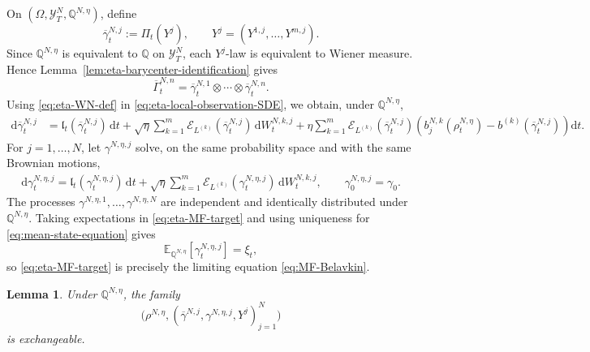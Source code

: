 \documentclass[10pt,a4paper,reqno]{amsart}
\numberwithin{equation}{section}
\theoremstyle{plain}
\newtheorem{lemma}[theorem]{Lemma}
\theoremstyle{definition}
\theoremstyle{remark}
\renewcommand{\d}{\mathrm d}
\newcommand{\E}{\mathbb E}
\newcommand{\Q}{\mathbb Q}
\newcommand{\cE}{\mathcal E}
\newcommand{\cY}{\mathcal Y}
\newcommand{\1}{\mathbf 1}
\begin{document}
On \((\Omega,\cY_T^N,\Q^{N,\eta})\), define
\begin{equation}
  \overline\gamma_t^{N,j}
  :=
  \Pi_t(Y^j),
  \qquad
  Y^j=(Y^{1,j},\ldots,Y^{m,j}).
  \label{eq:eta-bar-gamma-N-def}
\end{equation}
Since \(\Q^{N,\eta}\) is equivalent to \(\Q\) on \(\cY_T^N\), each
\(Y^j\)-law is equivalent to Wiener measure.  Hence
Lemma~\ref{lem:eta-barycenter-identification} gives
\begin{equation}
  \overline\Gamma_t^{N,n}
  =
  \overline\gamma_t^{N,1}
  \otimes\cdots\otimes
  \overline\gamma_t^{N,n}.
  \label{eq:eta-bar-Gamma-product}
\end{equation}
Using \eqref{eq:eta-WN-def} in
\eqref{eq:eta-local-observation-SDE}, we obtain, under
\(\Q^{N,\eta}\),
\begin{equation}
\begin{aligned}
  \d\overline\gamma_t^{N,j}
  &=
  \mathfrak l_t(\overline\gamma_t^{N,j})\,\d t
  +
  \sqrt{\eta}
  \sum_{k=1}^m
  \cE_{L^{(k)}}(\overline\gamma_t^{N,j})\,\d W_t^{N,k,j}
  +
  \eta
  \sum_{k=1}^m
  \cE_{L^{(k)}}(\overline\gamma_t^{N,j})
  \left(
    b_j^{N,k}(\rho_t^{N,\eta})
    -
    b^{(k)}(\overline\gamma_t^{N,j})
  \right)\d t.
\end{aligned}
  \label{eq:eta-bar-gamma-under-Qeta}
\end{equation}
For \(j=1,\ldots,N\), let \(\gamma^{N,\eta,j}\) solve, on the same
probability space and with the same Brownian motions,
\begin{equation}
\begin{aligned}
  \d\gamma_t^{N,\eta,j}
  =
  \mathfrak l_t(\gamma_t^{N,\eta,j})\,\d t
  +
  \sqrt{\eta}
  \sum_{k=1}^m
  \cE_{L^{(k)}}(\gamma_t^{N,\eta,j})\,\d W_t^{N,k,j},\qquad 
  \gamma_0^{N,\eta,j}
  =
  \gamma_0.
\end{aligned}
  \label{eq:eta-MF-target}
\end{equation}
The processes \(\gamma^{N,\eta,1},\ldots,\gamma^{N,\eta,N}\) are independent
and identically distributed under \(\Q^{N,\eta}\).  Taking expectations in
\eqref{eq:eta-MF-target} and using uniqueness for
\eqref{eq:mean-state-equation} gives
\[
  \E_{\Q^{N,\eta}}[\gamma_t^{N,\eta,j}]
  =
  \xi_t,
\]
so \eqref{eq:eta-MF-target} is precisely the limiting equation
\eqref{eq:MF-Belavkin}.

\begin{lemma}
\label{lem:eta-projected-exchangeability}
Under $\Q^{N,\eta}$, the family
\[
  \bigl(
    \rho^{N,\eta},
    (\overline\gamma^{N,j},\gamma^{N,\eta,j},Y^j)_{j=1}^N
  \bigr)
\]
is exchangeable.
\end{lemma}
\end{document}
